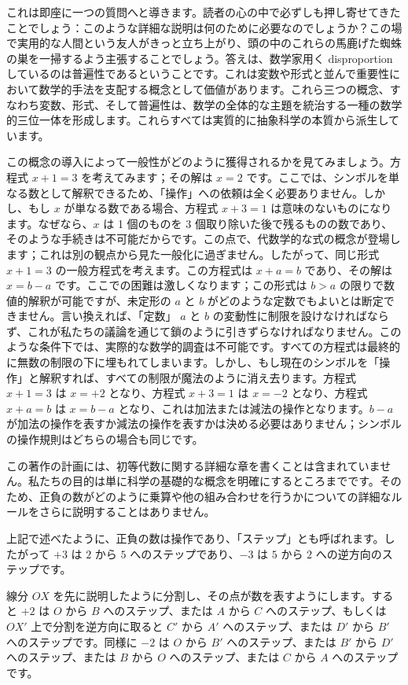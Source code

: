 \documentclass[a4paper,11pt,openany]{ltjsbook}
\begin{document}
これは即座に一つの質問へと導きます。読者の心の中で必ずしも押し寄せてきたことでしょう：このような詳細な説明は何のために必要なのでしょうか？この場で実用的な人間という友人がきっと立ち上がり、頭の中のこれらの馬鹿げた蜘蛛の巣を一掃するよう主張することでしょう。答えは、数学家用く disproportion しているのは普遍性であるということです。これは変数や形式と並んで重要性において数学的手法を支配する概念として価値があります。これら三つの概念、すなわち変数、形式、そして普遍性は、数学の全体的な主題を統治する一種の数学的三位一体を形成します。これらすべては実質的に抽象科学の本質から派生しています。

この概念の導入によって一般性がどのように獲得されるかを見てみましょう。方程式 $x + 1 = 3$ を考えてみます；その解は $x = 2$ です。ここでは、シンボルを単なる数として解釈できるため、「操作」への依頼は全く必要ありません。しかし、もし $x$ が単なる数である場合、方程式 $x + 3 = 1$ は意味のないものになります。なぜなら、$x$ は 1 個のものを 3 個取り除いた後で残るものの数であり、そのような手続きは不可能だからです。この点で、代数学的な式の概念が登場します；これは別の観点から見た一般化に過ぎません。したがって、同じ形式 $x + 1 = 3$ の一般方程式を考えます。この方程式は $x + a = b$ であり、その解は $x = b - a$ です。ここでの困難は激しくなります；この形式は $b > a$ の限りで数値的解釈が可能ですが、未定形の $a$ と $b$ がどのような定数でもよいとは断定できません。言い換えれば、「定数」 $a$ と $b$ の変動性に制限を設けなければならず、これが私たちの議論を通じて鎖のように引きずらなければなりません。このような条件下では、実際的な数学的調査は不可能です。すべての方程式は最終的に無数の制限の下に埋もれてしまいます。しかし、もし現在のシンボルを「操作」と解釈すれば、すべての制限が魔法のように消え去ります。方程式 $x + 1 = 3$ は $x = +2$ となり、方程式 $x + 3 = 1$ は $x = -2$ となり、方程式 $x + a = b$ は $x = b - a$ となり、これは加法または減法の操作となります。$b - a$ が加法の操作を表すか減法の操作を表すかは決める必要はありません；シンボルの操作規則はどちらの場合も同じです。

この著作の計画には、初等代数に関する詳細な章を書くことは含まれていません。私たちの目的は単に科学の基礎的な概念を明確にするところまでです。そのため、正負の数がどのように乗算や他の組み合わせを行うかについての詳細なルールをさらに説明することはありません。

上記で述べたように、正負の数は操作であり、「ステップ」とも呼ばれます。したがって $+3$ は $2$ から $5$ へのステップであり、$-3$ は $5$ から $2$ への逆方向のステップです。

線分 $OX$ を先に説明したように分割し、その点が数を表すようにします。すると $+2$ は $O$ から $B$ へのステップ、または $A$ から $C$ へのステップ、もしくは $OX'$ 上で分割を逆方向に取ると $C'$ から $A'$ へのステップ、または $D'$ から $B'$ へのステップです。同様に $-2$ は $O$ から $B'$ へのステップ、または $B'$ から $D'$ へのステップ、または $B$ から $O$ へのステップ、または $C$ から $A$ へのステップです。
\end{document}
